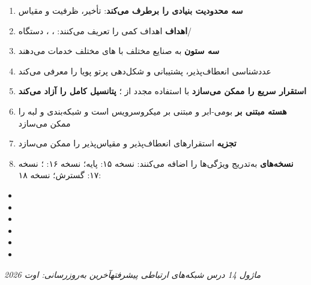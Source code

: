 
\begin{enumerate}
\def\labelenumi{\arabic{enumi}.}
\tightlist
\item
  \textbf{ سه محدودیت بنیادی  را برطرف می‌کند}: تأخیر، ظرفیت و مقیاس 
\item
  \textbf{اهداف } اهداف کمی را تعریف می‌کنند: ، ،  دستگاه/\allowbreak{}
\item
  \textbf{سه ستون}  به صنایع مختلف با های مختلف خدمات می‌دهند
\item
   عددشناسی انعطاف‌پذیر، پشتیبانی  و شکل‌دهی پرتو پویا را معرفی می‌کند
\item
  \textbf{ استقرار سریع را ممکن می‌سازد} با استفاده مجدد از ؛ \textbf{ پتانسیل کامل  را آزاد می‌کند}
\item
  \textbf{هسته  مبتنی بر } بومی-ابر و مبتنی بر میکروسرویس است و شبکه‌بندی و لبه را ممکن می‌سازد
\item
  \textbf{تجزیه }  استقرارهای انعطاف‌پذیر و مقیاس‌پذیر را ممکن می‌سازد
\item
  \textbf{نسخه‌های } به‌تدریج ویژگی‌ها را اضافه می‌کنند: نسخه ۱۵: پایه؛ نسخه ۱۶: ؛ نسخه ۱۷: گسترش؛ نسخه ۱۸: 
\end{enumerate}


\begin{itemize}
\tightlist
\item
\item
\item
\item
\item
\item
\end{itemize}

\emph{ماژول 14  درس شبکه‌های ارتباطی پیشرفته}\CNbr{}\emph{آخرین به‌روزرسانی: اوت 2026}

